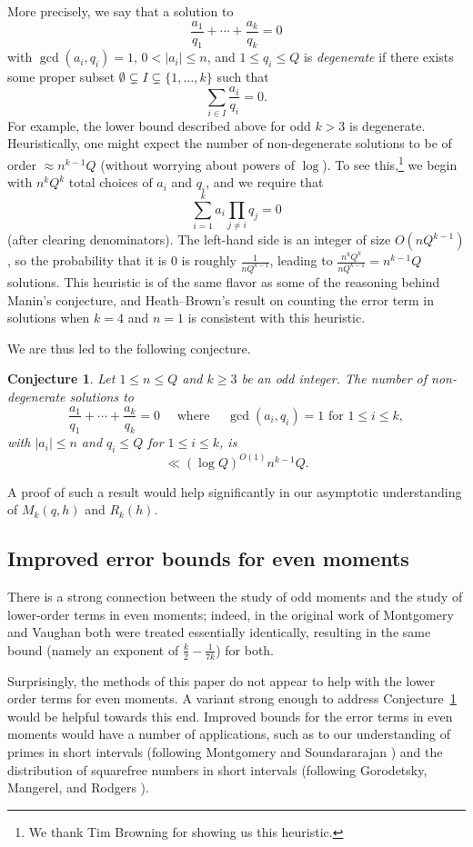 \documentclass[11pt,letterpaper]{amsart}
\newcommand{\abs}[1]{\left\lvert #1\right\rvert}
\newcommand{\ogcd}[2]{\gcd(#1,#2)}
\newtheorem{conjecture}{Conjecture}
\theoremstyle{definition}
\begin{document}
More precisely, we say that a solution to
\[\frac{a_1}{q_1} + \cdots + \frac{a_k}{q_k} = 0\]
with $\ogcd{a_i}{q_i} = 1$, $0 < |a_i| \leq n$, and $1 \leq q_i \leq Q$ is \emph{degenerate} if there exists some proper subset $\emptyset \subsetneq I \subsetneq \{1, \ldots, k\}$ such that
\[\sum_{i \in I} \frac{a_i}{q_i} = 0.\]
For example, the lower bound described above for odd $k > 3$ is degenerate. Heuristically, one might expect the number of non-degenerate solutions to be of order $\approx n^{k-1}Q$ (without worrying about powers of $\log$). To see this,\footnote{We thank Tim Browning for showing us this heuristic.} we begin with $n^kQ^k$ total choices of $a_i$ and $q_i$, and we require that 
\[\sum_{i=1}^k a_i \prod_{j \ne i} q_j = 0 \]
(after clearing denominators). The left-hand side is an integer of size $O(nQ^{k-1})$, so the probability that it is $0$ is roughly $\frac 1{nQ^{k-1}}$, leading to $\frac{n^kQ^k}{nQ^{k-1}} = n^{k-1}Q$ solutions. This heuristic is of the same flavor as some of the reasoning behind Manin's conjecture, and Heath--Brown's result \cite{H-B} on counting the error term in solutions when $k = 4$ and $n = 1$ is consistent with this heuristic.

We are thus led to the following conjecture.
\begin{conjecture}\label{conj1}
Let $1\leq n\leq Q$ and $k\geq 3$ be an odd integer. The number of non-degenerate solutions to
\[\frac{a_1}{q_1}+\cdots+\frac{a_{k}}{q_{k}}= 0\quad\textrm{ where }\quad\ogcd{a_i}{q_i}=1\textrm{ for }1\leq i\leq k,\] 
with $\abs{a_i}\leq n$ and $q_i\leq Q$ for $1\leq i\leq k$, is
\[\ll (\log Q)^{O(1)} n^{k-1}Q.\]
\end{conjecture}

A proof of such a result would help significantly in our asymptotic understanding of $M_k(q,h)$ and $R_k(h)$.
\subsection{Improved error bounds for even moments}
There is a strong connection between the study of odd moments and the study of lower-order terms in even moments; indeed, in the original work of Montgomery and Vaughan \cite{MV86} both were treated essentially identically, resulting in the same bound (namely an exponent of $\frac{k}{2}-\frac{1}{7k}$) for both. 

Surprisingly, the methods of this paper do not appear to help with the lower order terms for even moments. A variant strong enough to address Conjecture~\ref{conj1} would be helpful towards this end. Improved bounds for the error terms in even moments would have a number of applications, such as to our understanding of primes in short intervals (following Montgomery and Soundararajan \cite{MS04}) and the distribution of squarefree numbers in short intervals (following Gorodetsky, Mangerel, and Rodgers \cite{GMR}). 
\end{document}
